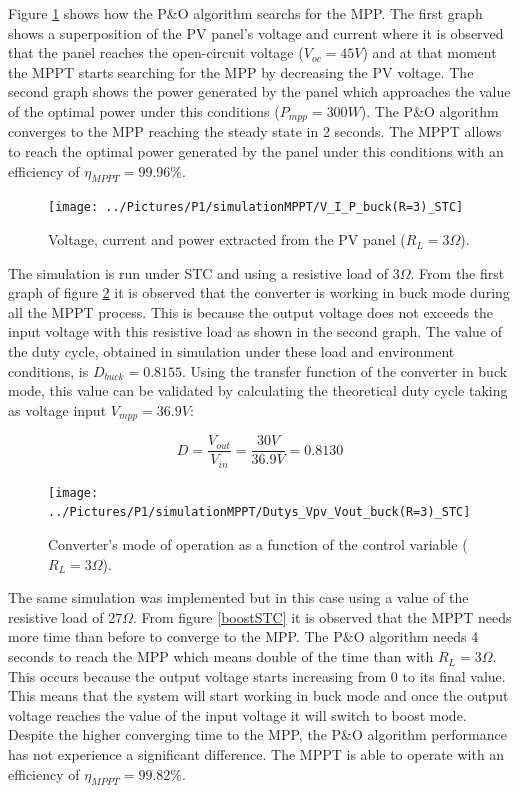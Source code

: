  Figure \ref{buckSTC} shows how the P\&O algorithm searchs for the MPP. The first graph shows a superposition of the PV panel's voltage and current where it is observed that the panel reaches the open-circuit voltage ($V_{oc}=45 V$) and at that moment the MPPT starts searching for the MPP by decreasing the PV voltage. The second graph shows the power generated by the panel which approaches the value of the optimal power under this conditions ($P_{mpp}=300 W$). The P\&O algorithm converges to the MPP reaching the steady state in 2 seconds. The MPPT allows to reach the optimal power generated by the panel under this conditions with an efficiency of $\eta_{MPPT} = 99.96\% $.
\begin{figure}[H]
	\begin{center}
		\texttt{[image: ../Pictures/P1/simulationMPPT/V\_I\_P\_buck(R=3)\_STC]}
		\caption{Voltage, current and power extracted from the PV panel ($R_{L}=3\Omega$).}
		\label{buckSTC} 
	\end{center}	
\end{figure}

The simulation is run under STC and using a resistive load of $3\Omega$. From the first graph of figure \ref{buckSTC_duty} it is observed that the converter is working in buck mode during all the MPPT process. This is because the output voltage does not exceeds the input voltage with this resistive load as shown in the second graph. The value of the duty cycle, obtained in simulation under these load and environment conditions, is $D_{buck}= 0.8155$. Using the transfer function of the converter in  buck mode, this value can be validated by calculating the theoretical duty cycle taking as voltage input $V_{mpp}=36.9 V$: 

\begin{equation}\label{buckmodeTF}
D = \frac{V_{out}}{V_{in}} = \frac{30V}{36.9V}= 0.8130 
\end{equation}



\begin{figure}[H]
	\begin{center}
		\texttt{[image: ../Pictures/P1/simulationMPPT/Dutys\_Vpv\_Vout\_buck(R=3)\_STC]}
		\caption{Converter's mode of operation as a function of the control variable ($R_{L}=3\Omega$).}
		\label{buckSTC_duty} 
	\end{center}	
\end{figure}

The same simulation was implemented but in this case using a value of the resistive load of $27\Omega$. From figure \ref{boostSTC} it is observed that the MPPT needs more time than before to converge to the MPP. The P\&O algorithm needs 4 seconds to reach the MPP which means double of the time than with $R_{L}=3\Omega$. This occurs because the output voltage starts increasing from 0 to its final value. This means that the system will start working in buck mode and once the output voltage reaches the value of the input voltage it will switch to boost mode. Despite the higher converging time to the MPP, the P\&O algorithm performance has not experience a significant difference. The MPPT is able to operate with an efficiency of $\eta_{MPPT} = 99.82\% $.


